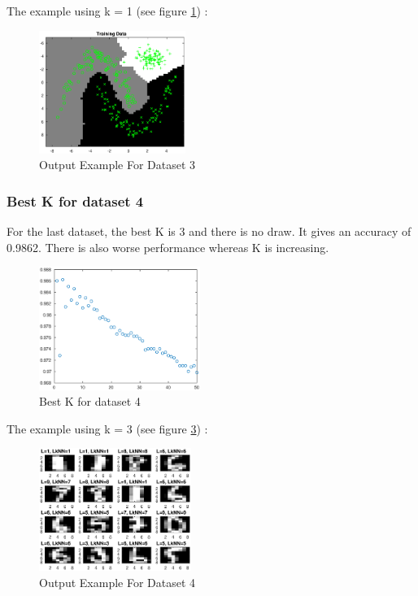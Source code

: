 \documentclass{article}
\begin{document}
The example using k = 1 (see figure \ref{fig:resultsknn3}) :

\begin{figure}[H]
\centering
\includegraphics[height=4cm]{images/resultsknn3}
\caption{Output Example For Dataset 3}
\label{fig:resultsknn3}
\end{figure}

\subsubsection {Best K for dataset 4}
For the last dataset, the best K is 3 and there is no draw. It gives an accuracy of 0.9862. There is also worse performance whereas K is increasing.

\begin{figure}[H]
\centering
\includegraphics[height=4cm]{images/bestkdataset4}
\caption{Best K for dataset 4}
\label{fig:bestkdataset4}
\end{figure}

The example using k = 3 (see figure \ref{fig:resultsknn4}) :

\begin{figure}[H]
\centering
\includegraphics[height=4cm]{images/resultsknn4}
\caption{Output Example For Dataset 4}
\label{fig:resultsknn4}
\end{figure}
\end{document}
